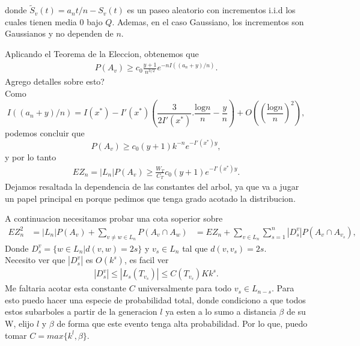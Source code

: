 \documentclass[12pt]{report}
\begin{document}
donde $\tilde{S}_v (t) = a_n t / n - S_v (t)$ es un paseo aleatorio con incrementos i.i.d los cuales tienen media $0$ bajo $Q$. 
Ademas, en el caso Gaussiano, los incrementos son Gaussianos y no dependen de $n$.

Aplicando el Teorema de la Eleccion, obtenemos que 
\begin{align}
    P(A_v) \geq c_0 \frac{y+1}{n^{3/2}} e^{-nI((a_n+y)/n)}.
\end{align}
Agrego detalles sobre esto? \\
Como 
\[
I((a_n+y)/n) = I(x^*) - I'(x^*)\left(\frac{3}{2I'(x^*)}.\frac{\text{log}n}{n}-\frac{y}{n}\right)+O\left(\left(\frac{\text{log}n}{n}\right)^2\right),
\]
podemos concluir que
\[
P(A_v) \geq c_0 (y+1)k^{-n}e^{-I'(x^*)y},
\]
y por lo tanto
\begin{align}
    EZ_n = |L_n| P(A_v) \geq \frac{W_T}{C_T}c_0 (y+1) e^{-I'(x^*)y}.
\end{align}
Dejamos resaltada la dependencia de las constantes del arbol, ya que va a jugar un papel principal en porque pedimos que tenga grado acotado la distribucion.
\par
A continuacion necesitamos probar una cota soperior sobre
\begin{align}
    EZ_n^2 &= |L_n|P(A_v) + \sum_{v \neq w \in L_n}^{} P(A_v \cap A_w) 
           &= EZ_n + \sum_{v \in L_n}^{} \sum_{s = 1}^{n} |D_s^v| P(A_v \cap A_{v_s}),
\end{align}
Donde $D_s^v = \{ w \in L_n | d(v,w) = 2s \} $ y $v_s \in L_n$ tal que $d(v,v_s) = 2s$. \\
Necesito ver que $|D_s^v|$ es $O(k^s)$, es facil ver
\begin{align}
    |D_s^v| \leq |L_s(T_{v_s})| \leq C(T_{v_s}) K k^s.
\end{align}
Me faltaria acotar esta constante $C$ universalmente para todo $v_s \in L_{n-s}$. Para esto puedo hacer una 
especie de probabilidad total, donde condiciono a que todos estos subarboles a partir de la generacion $l$ 
ya esten a lo sumo a distancia $\beta$ de su W, elijo $l$ y $\beta$ de forma que este evento tenga alta 
probabilidad. Por lo que, puedo tomar $C = max\{k^l, \beta\}$. 

\vspace{1em}
\end{document}
